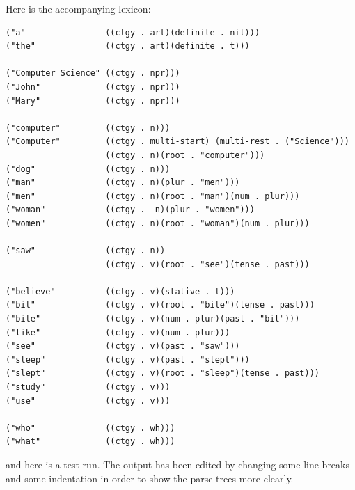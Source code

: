 \documentclass{book}
\begin{document}
Here is the accompanying lexicon:
\begin{verbatim}
("a"                ((ctgy . art)(definite . nil)))
("the"              ((ctgy . art)(definite . t)))

("Computer Science" ((ctgy . npr)))
("John"             ((ctgy . npr)))
("Mary"             ((ctgy . npr)))

("computer"         ((ctgy . n)))
("Computer"         ((ctgy . multi-start) (multi-rest . ("Science")))
                    ((ctgy . n)(root . "computer")))
("dog"              ((ctgy . n)))
("man"              ((ctgy . n)(plur . "men")))
("men"              ((ctgy . n)(root . "man")(num . plur)))
("woman"            ((ctgy .  n)(plur . "women")))
("women"            ((ctgy . n)(root . "woman")(num . plur)))

("saw"              ((ctgy . n))
                    ((ctgy . v)(root . "see")(tense . past)))

("believe"          ((ctgy . v)(stative . t)))
("bit"              ((ctgy . v)(root . "bite")(tense . past)))
("bite"             ((ctgy . v)(num . plur)(past . "bit")))
("like"             ((ctgy . v)(num . plur)))
("see"              ((ctgy . v)(past . "saw")))
("sleep"            ((ctgy . v)(past . "slept")))
("slept"            ((ctgy . v)(root . "sleep")(tense . past))) 
("study"            ((ctgy . v)))
("use"              ((ctgy . v)))

("who"              ((ctgy . wh)))
("what"             ((ctgy . wh)))
\end{verbatim}
and here is a test run.  The output has been edited by changing some
line breaks and some indentation in order to show the parse
trees more clearly.
\end{document}
